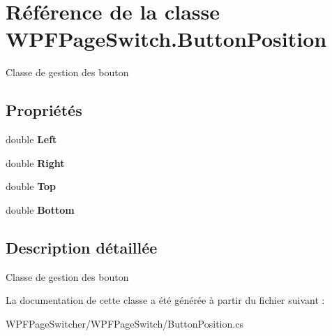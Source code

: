 \hypertarget{class_w_p_f_page_switch_1_1_button_position}{\section{Référence de la classe W\+P\+F\+Page\+Switch.\+Button\+Position}
\label{class_w_p_f_page_switch_1_1_button_position}
}


Classe de gestion des bouton  


\subsection*{Propriétés}
\begin{DoxyCompactItemize}
\item 
\hypertarget{class_w_p_f_page_switch_1_1_button_position_ac56eac24ee7f302add0c6e6d3d3e1874}{double {\bfseries Left}}\label{class_w_p_f_page_switch_1_1_button_position_ac56eac24ee7f302add0c6e6d3d3e1874}

\item 
\hypertarget{class_w_p_f_page_switch_1_1_button_position_aea3f1da5e0fad3fef73a2f5d10a00c0c}{double {\bfseries Right}}\label{class_w_p_f_page_switch_1_1_button_position_aea3f1da5e0fad3fef73a2f5d10a00c0c}

\item 
\hypertarget{class_w_p_f_page_switch_1_1_button_position_aeebf553328308359312cd6efc78ed345}{double {\bfseries Top}}\label{class_w_p_f_page_switch_1_1_button_position_aeebf553328308359312cd6efc78ed345}

\item 
\hypertarget{class_w_p_f_page_switch_1_1_button_position_a195cf18ea189baae62b8f95a7b8dd8f8}{double {\bfseries Bottom}}\label{class_w_p_f_page_switch_1_1_button_position_a195cf18ea189baae62b8f95a7b8dd8f8}

\end{DoxyCompactItemize}


\subsection{Description détaillée}
Classe de gestion des bouton 



La documentation de cette classe a été générée à partir du fichier suivant \+:\begin{DoxyCompactItemize}
\item 
W\+P\+F\+Page\+Switcher/\+W\+P\+F\+Page\+Switch/Button\+Position.\+cs\end{DoxyCompactItemize}
